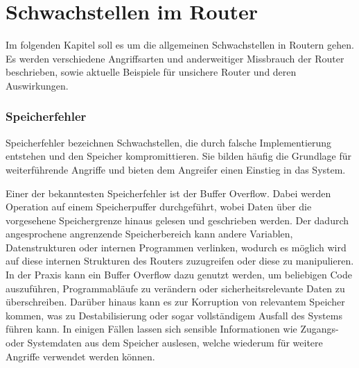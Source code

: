 	\chapter{Schwachstellen im Router}
	\label{sec:Schwachstellen im Router}
	Im folgenden Kapitel soll es um die allgemeinen Schwachstellen in Routern gehen.
	Es werden verschiedene Angriffsarten und anderweitiger Missbrauch der Router beschrieben, 
	sowie aktuelle Beispiele für unsichere Router und deren Auswirkungen.
	\subsection{Speicherfehler}
	Speicherfehler bezeichnen Schwachstellen, die durch falsche Implementierung entstehen und 
	den Speicher kompromittieren. Sie bilden häufig die Grundlage für weiterführende Angriffe und bieten dem
	Angreifer einen Einstieg in das System.

	Einer der bekanntesten Speicherfehler ist der Buffer Overflow. Dabei werden Operation auf einem Speicherpuffer
	durchgeführt, wobei Daten über die vorgesehene Speichergrenze hinaus gelesen und geschrieben werden. 
	Der dadurch angesprochene angrenzende Speicherbereich kann andere Variablen, Datenstrukturen oder
	internen Programmen verlinken, wodurch es möglich wird auf diese internen Strukturen des Routers
	zuzugreifen oder diese zu manipulieren. In der Praxis kann ein Buffer Overflow dazu genutzt werden, 
	um beliebigen Code auszuführen, Programmabläufe zu verändern oder sicherheitsrelevante Daten zu überschreiben.
	Darüber hinaus kann es zur Korruption von relevantem Speicher kommen,
	was zu Destabilisierung oder sogar vollständigem Ausfall des Systems führen kann. 
	In einigen Fällen lassen sich sensible Informationen
	wie Zugangs- oder Systemdaten aus dem Speicher auslesen, welche wiederum für weitere Angriffe verwendet werden können.

